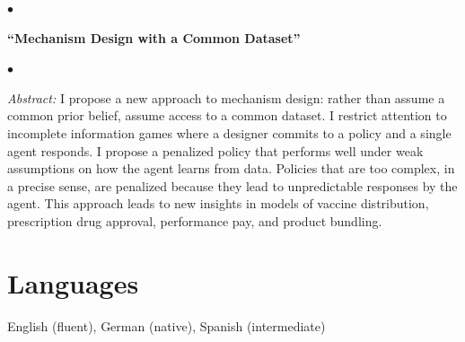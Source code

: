 \documentclass[margin,line]{res}
\newenvironment{list1}{
  \begin{list}{\ding{113}}{%
      \setlength{\itemsep}{.025in}
      \setlength{\parsep}{0in} \setlength{\parskip}{0in}
      \setlength{\topsep}{0in} \setlength{\partopsep}{0in}
      \setlength{\leftmargin}{0.17in}}}{\end{list}}
\newenvironment{list2}{
  \begin{list}{$\bullet$}{%
      \setlength{\itemsep}{0in}
      \setlength{\parsep}{0in} \setlength{\parskip}{0in}
      \setlength{\topsep}{0in} \setlength{\partopsep}{0in}
      \setlength{\leftmargin}{0.2in}}}{\end{list}}
\begin{document}
\begin{resume}
\begin{list1}
\begin{list2}
		
	\end{list2}
\end{list1}
\vspace*{.1in}
\begin{list1}
	\item[] \textbf{``Mechanism Design with a Common Dataset''}
\vspace*{.05in}
	\begin{list2}
		\item[] \textit{Abstract:} 
		I propose a new approach to mechanism design: rather than assume a common prior belief, assume access to a common dataset.
		I restrict attention to incomplete information games where a designer commits to a policy and a single agent responds.
		I propose a penalized policy that performs well under weak assumptions on how the agent learns from data.
		Policies that are too complex, in a precise sense, are penalized because they lead to unpredictable responses by the agent.
		This approach leads to new insights in models of vaccine distribution, prescription drug approval, performance pay, and product bundling.
	\end{list2}
\end{list1}

\section{Languages}
\begin{list1}
\item[] English (fluent), German (native), Spanish (intermediate)
\end{list1}


\end{resume}
\end{document}
